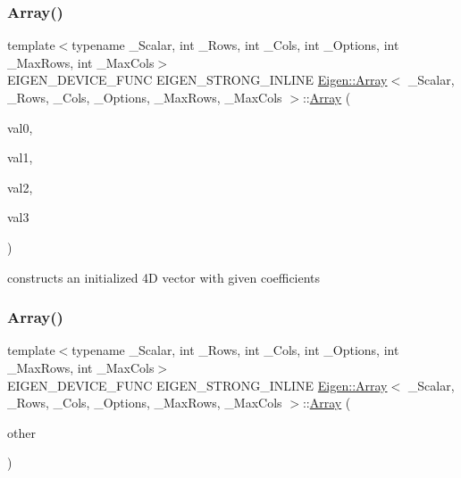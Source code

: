 \subsubsection{\texorpdfstring{Array()}{Array()}\hspace{0.1cm}{\footnotesize\ttfamily [3/5]}}
{\footnotesize\ttfamily template$<$typename \+\_\+\+Scalar, int \+\_\+\+Rows, int \+\_\+\+Cols, int \+\_\+\+Options, int \+\_\+\+Max\+Rows, int \+\_\+\+Max\+Cols$>$ \\
E\+I\+G\+E\+N\+\_\+\+D\+E\+V\+I\+C\+E\+\_\+\+F\+U\+NC E\+I\+G\+E\+N\+\_\+\+S\+T\+R\+O\+N\+G\+\_\+\+I\+N\+L\+I\+NE \mbox{\hyperlink{class_eigen_1_1_array}{Eigen\+::\+Array}}$<$ \+\_\+\+Scalar, \+\_\+\+Rows, \+\_\+\+Cols, \+\_\+\+Options, \+\_\+\+Max\+Rows, \+\_\+\+Max\+Cols $>$\+::\mbox{\hyperlink{class_eigen_1_1_array}{Array}} (\begin{DoxyParamCaption}\item[{const Scalar \&}]{val0,  }\item[{const Scalar \&}]{val1,  }\item[{const Scalar \&}]{val2,  }\item[{const Scalar \&}]{val3 }\end{DoxyParamCaption})\hspace{0.3cm}{\ttfamily [inline]}}

constructs an initialized 4D vector with given coefficients \mbox{\label{class_eigen_1_1_array_a085268ca25404d706e7b8f4d33f15513}} 
\subsubsection{\texorpdfstring{Array()}{Array()}\hspace{0.1cm}{\footnotesize\ttfamily [4/5]}}
{\footnotesize\ttfamily template$<$typename \+\_\+\+Scalar, int \+\_\+\+Rows, int \+\_\+\+Cols, int \+\_\+\+Options, int \+\_\+\+Max\+Rows, int \+\_\+\+Max\+Cols$>$ \\
E\+I\+G\+E\+N\+\_\+\+D\+E\+V\+I\+C\+E\+\_\+\+F\+U\+NC E\+I\+G\+E\+N\+\_\+\+S\+T\+R\+O\+N\+G\+\_\+\+I\+N\+L\+I\+NE \mbox{\hyperlink{class_eigen_1_1_array}{Eigen\+::\+Array}}$<$ \+\_\+\+Scalar, \+\_\+\+Rows, \+\_\+\+Cols, \+\_\+\+Options, \+\_\+\+Max\+Rows, \+\_\+\+Max\+Cols $>$\+::\mbox{\hyperlink{class_eigen_1_1_array}{Array}} (\begin{DoxyParamCaption}\item[{const \mbox{\hyperlink{class_eigen_1_1_array}{Array}}$<$ \+\_\+\+Scalar, \+\_\+\+Rows, \+\_\+\+Cols, \+\_\+\+Options, \+\_\+\+Max\+Rows, \+\_\+\+Max\+Cols $>$ \&}]{other }\end{DoxyParamCaption})\hspace{0.3cm}{\ttfamily [inline]}}

